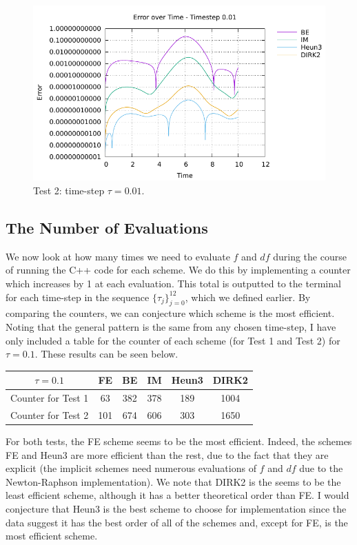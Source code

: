 \documentclass[10pt]{article}
\begin{document}
 \begin{figure}[H]
 \begin{center}
    \includegraphics[width=1\textwidth]{plot2_001.pdf}
  \end{center}
  \caption{Test 2: time-step $\tau = 0.01$.
  \label{fig: 2_001}}
\end{figure}

\subsection{The Number of Evaluations}

We now look at how many times we need to evaluate $f$ and $df$ during the course of running the C++ code for each scheme. We do this by implementing a counter which increases by 1 at each evaluation. This total is outputted to the terminal for each time-step in the sequence $\{\tau_j \}_{j=0}^{12}$, which we defined earlier. By comparing the counters, we can conjecture which scheme is the most efficient. Noting that the general pattern is the same from any chosen time-step, I have only included a table for the counter of each scheme (for Test 1 and Test 2) for $\tau = 0.1$. These results can be seen below.


\begin{center}

    \begin{tabular}{|c||c|c|c|c|c|}
    \hline
      $\tau = 0.1$  & FE & BE & IM & Heun3 & DIRK2\\
    \hline
       \hline
       Counter for Test 1  & 63 & 382 & 378& 189 & 1004   \\
       \hline
       Counter for Test 2  & 101  & 674& 606 & 303 & 1650  \\
        \hline
    \end{tabular}
\end{center}

For both tests, the FE scheme seems to be the most efficient. Indeed, the schemes FE and Heun3 are more efficient than the rest, due to the fact that they are explicit (the implicit schemes need numerous evaluations of $f$ and $df$ due to the Newton-Raphson implementation). We note that DIRK2 is the seems to be the least efficient scheme, although it has a better theoretical order than FE. I would conjecture that Heun3 is the best scheme to choose for implementation since the data suggest it has the best order of all of the schemes and, except for FE, is the most efficient scheme.
\end{document}
